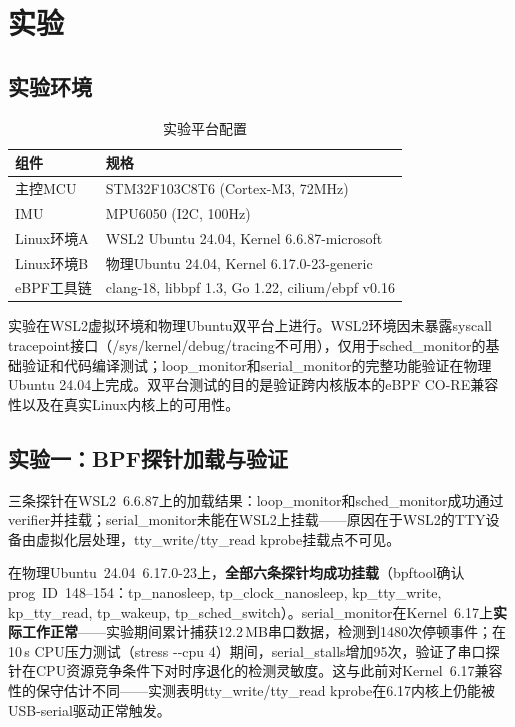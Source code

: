 \documentclass{rjthesis}
\begin{document}
\section{实验}

\subsection{实验环境}

\begin{table}[h]
    \centering
    \caption{实验平台配置}
    \label{tab:platform}
    \small
    \begin{tabular}{l l}
        \toprule
        组件 & 规格 \\
        \midrule
        主控MCU & STM32F103C8T6 (Cortex-M3, 72MHz) \\
        IMU & MPU6050 (I2C, 100Hz) \\
        Linux环境A & WSL2 Ubuntu 24.04, Kernel 6.6.87-microsoft \\
        Linux环境B & 物理Ubuntu 24.04, Kernel 6.17.0-23-generic \\
        eBPF工具链 & clang-18, libbpf 1.3, Go 1.22, cilium/ebpf v0.16 \\
        \bottomrule
    \end{tabular}
\end{table}

实验在WSL2虚拟环境和物理Ubuntu双平台上进行。WSL2环境因未暴露syscall tracepoint接口（/sys/kernel/debug/tracing不可用），仅用于sched\_monitor的基础验证和代码编译测试；loop\_monitor和serial\_monitor的完整功能验证在物理Ubuntu 24.04上完成。双平台测试的目的是验证跨内核版本的eBPF CO-RE兼容性以及在真实Linux内核上的可用性。

\subsection{实验一：BPF探针加载与验证}

三条探针在WSL2~6.6.87上的加载结果：loop\_monitor和sched\_monitor成功通过verifier并挂载；serial\_monitor未能在WSL2上挂载——原因在于WSL2的TTY设备由虚拟化层处理，tty\_write/tty\_read kprobe挂载点不可见。

在物理Ubuntu~24.04~6.17.0-23上，\textbf{全部六条探针均成功挂载}（bpftool确认prog~ID~148--154：tp\_nanosleep, tp\_clock\_nanosleep, kp\_tty\_write, kp\_tty\_read, tp\_wakeup, tp\_sched\_switch）。serial\_monitor在Kernel~6.17上\textbf{实际工作正常}——实验期间累计捕获12.2\,MB串口数据，检测到1480次停顿事件；在10\,s CPU压力测试（stress -{}-cpu 4）期间，serial\_stalls增加95次，验证了串口探针在CPU资源竞争条件下对时序退化的检测灵敏度。这与此前对Kernel~6.17兼容性的保守估计不同——实测表明tty\_write/tty\_read kprobe在6.17内核上仍能被USB-serial驱动正常触发。
\end{document}
